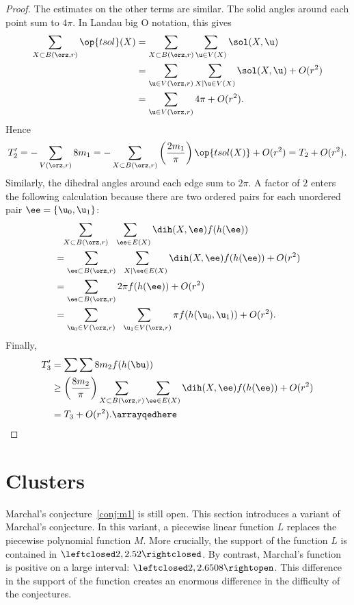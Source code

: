 \begin{proof}
The estimates on the other terms are similar.  The solid angles
around each point sum to $4\pi$.
In Landau big O notation, this gives
\begin{align*} 
\sum_{X\subset B(\orz,r)} \op{tsol}(X) &= 
\sum_{X\subset B(\orz,r)} \sum_{ \u\in V( X)} \sol(X, \u)\\
&=\sum_{ \u\in  V(\orz,r)} \sum_{X\mid  \u\in V( X)} \sol(X, \u) + O(r^2)\\
&=\sum_{ \u\in  V(\orz,r)} 4\pi    + O(r^2).
\end{align*}
Hence
\[  
T_2' = -\sum_{ V(\orz,r)} 8 m_1 = 
-\sum_{X\subset B(\orz,r)}\left(\frac{2m_1}\pi\right) \op{tsol(X)} + O(r^2) = T_2 + O(r^2).
\] 
Similarly, the dihedral angles around each edge sum to $2\pi$.  A
factor of $2$ enters the following calculation because there are two
ordered pairs for each unordered pair $\ee=\{ \u_0, \u_1\}$:
\begin{align*} 
&\phantom{=}\sum_{X\subset B(\orz,r)} \sum_{~~\ee\in E(X)} \dih(X,\ee)  f(h(\ee)) \vspace{3pt}\\
&=\sum_{\ee\subset B(\orz,r)} \sum_{~~X\mid \ee\in E(X)} \dih(X,\ee)  f(h(\ee)) +O(r^2)\vspace{3pt}\\
&=\sum_{\ee\subset B(\orz,r)} 2\pi f(h(\ee)) + O(r^2)\vspace{3pt} \\
&=\sum_{ \u_0\in  V(\orz,r)} \sum_{~~\u_1\in  V(\orz,r) } \pi f(h( \u_0, \u_1)) + O(r^2).\\
\end{align*}
Finally,
\arrayqed
\begin{align*} 
T_3' &= \sum\sum 8 m_2 f(h(\bu)) \\
&\ge \left(\frac{8m_2}\pi\right)
\sum_{X\subset B(\orz,r)}\sum_{\ee\in E(X)}\dih(X,\ee) f(h(\ee)) + O(r^2) \\
&= T_3 + O(r^2).\arrayqedhere
\end{align*}
\end{proof}




\section{Clusters}

Marchal's conjecture~\ref{conj:m1} is still open.  This section
introduces a variant of Marchal's conjecture.  In this variant,
a piecewise linear function $L$ replaces the piecewise polynomial
function $M$.  More crucially, the support of the function $L$ is
contained in $\leftclosed2,2.52\rightclosed$.  By contrast, Marchal's function is positive
on a large interval:
$\leftclosed2,2.6508\rightopen$.  This  difference in the
support of the function creates an enormous difference in the
difficulty of the conjectures.

